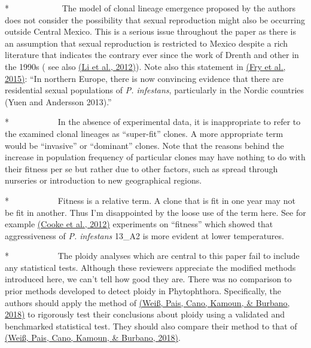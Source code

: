 \documentclass[10pt]{article}
\begin{document}
{\label{832948}}

*~~~~~~~~~~~~ The model of clonal lineage emergence proposed by the
authors does not consider the possibility that sexual reproduction might
also be occurring outside Central Mexico. This is a serious issue
throughout the paper as there is an assumption that sexual reproduction
is restricted to Mexico despite a rich literature that indicates the
contrary ever since the work of Drenth and other in the 1990s ( see also
\hyperref[csl:1]{(Li et al., 2012)}). Note also this statement in \hyperref[csl:2]{(Fry et al., 2015)}:
``In northern Europe, there is now convincing evidence that there are
residential sexual populations of \emph{P. infestans}, particularly in
the Nordic countries (Yuen and Andersson 2013).''

\par\null

*~~~~~~~~~~~ In the absence of experimental data, it is inappropriate to
refer to the examined clonal lineages as ``super-fit'' clones. A more
appropriate term would be ``invasive'' or ``dominant'' clones. Note that
the reasons behind the increase in population frequency of particular
clones may have nothing to do with their fitness per se but rather due
to other factors, such as spread through nurseries or introduction to
new geographical regions.

\par\null

*~~~~~~~~~~~ Fitness is a relative term. A clone that is fit in one year
may not be fit in another. Thus I'm disappointed by the loose use of the
term here. See for example \hyperref[csl:3]{(Cooke et al., 2012)} experiments on ``fitness''
which showed that aggressiveness of \emph{P. infestans} 13\_A2 is more
evident at lower temperatures.

\par\null

*~~~~~~~~~~~ The ploidy analyses which are central to this paper fail to
include any statistical tests. Although these reviewers appreciate the
modified methods introduced here, we can't tell how good they are. There
was no comparison to prior methods developed to detect ploidy in
Phytophthora. Specifically, the authors should apply the method of
\hyperref[csl:4]{(Weiß, Pais, Cano, Kamoun, \& Burbano, 2018)} to rigorously test their conclusions about ploidy
using a validated and benchmarked statistical test. They should also
compare their method to that of \hyperref[csl:4]{(Weiß, Pais, Cano, Kamoun, \& Burbano, 2018)}.
\end{document}
